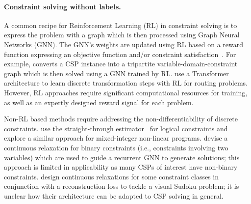 \paragraph{Constraint solving without labels.}

A common recipe for Reinforcement Learning (RL) in constraint solving is to express the problem with a graph  which is then processed using Graph Neural Networks (GNN). The GNN's weights are updated using RL based on a reward function expressing an objective function and/or constraint satisfaction~\cite{khalil2017learning, chalumeau2021seapearl, li2024gsatbench, boisvert2024towards}. For example, \citet{anycsp} converts a CSP instance into a tripartite variable-domain-constraint graph which is then solved using a GNN trained by RL. \citet{rltsp} use a Transformer architecture to learn discrete transformation steps with RL for routing problems. However, RL approaches require significant computational resources for training, as well as an expertly designed reward signal for each problem. 




Non-RL based methods require addressing the non-differentiability of discrete constraints. \citet{injectconstraints} use the straight-through estimator~\cite{bengio2013estimating} for logical constraints and \citet{bo-mip} explore a similar approach for mixed-integer non-linear programs. \citet{toenshoff2021graph} devise a continuous relaxation for binary constraints (i.e., constraints involving two variables) which are used to guide a recurrent GNN to generate solutions; this approach is limited in applicability as many CSPs of interest have non-binary constraints. \citet{clrdrnets} design continuous relaxations for some constraint classes in conjunction with a reconstruction loss to tackle a visual Sudoku problem; it is unclear how their architecture can be adapted to CSP solving in general. 



